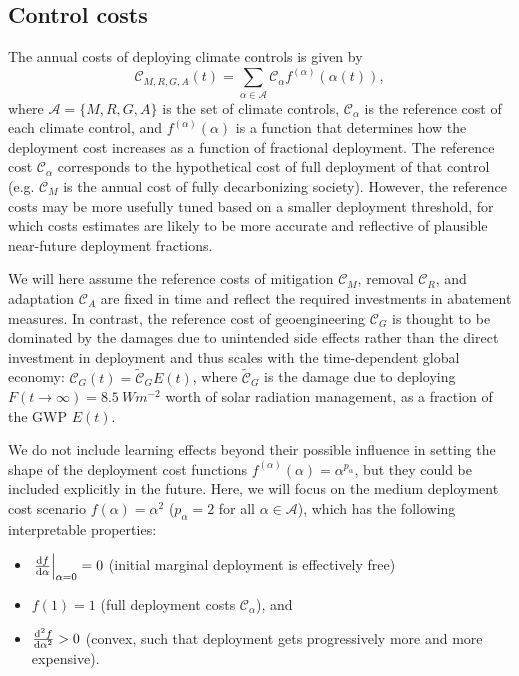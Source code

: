 \documentclass{article}
\begin{document}
\subsection{Control costs}

The annual costs of deploying climate controls is given by
\begin{equation}
    \mathcal{C}_{M, R, G, A}(t) = \sum_{\alpha \in \mathcal{A}} \mathcal{C}_{\alpha} f^{(\alpha)}(\alpha(t)),
\end{equation}
where $\mathcal{A} = \{M, R, G, A \}$ is the set of climate controls, $\mathcal{C}_{\alpha}$ is the reference cost of each climate control, and $f^{(\alpha)}(\alpha)$ is a function that determines how the deployment cost increases as a function of fractional deployment. The reference cost $\mathcal{C}_{\alpha}$ corresponds to the hypothetical cost of full deployment of that control (e.g. $\mathcal{C}_{M}$ is the annual cost of fully decarbonizing society). However, the reference costs may be more usefully tuned based on a smaller deployment threshold, for which costs estimates are likely to be more accurate and reflective of plausible near-future deployment fractions.

We will here assume the reference costs of mitigation $\mathcal{C}_{M}$, removal $\mathcal{C}_{R}$, and adaptation $\mathcal{C}_{A}$ are fixed in time and reflect the required investments in abatement measures. In contrast, the reference cost of geoengineering $\mathcal{C}_{G}$ is thought to be dominated by the damages due to unintended side effects rather than the direct investment in deployment and thus scales with the time-dependent global economy: $\mathcal{C}_{G}(t) = \tilde{\mathcal{C}}_{G} E(t)$, where $\tilde{\mathcal{C}}_{G}$ is the damage due to deploying $F(t \rightarrow \infty) = \SI{8.5}{W m^{-2}}$ worth of solar radiation management, as a fraction of the GWP $E(t)$.

We do not include learning effects beyond their possible influence in setting the shape of the deployment cost functions $f^{(\alpha)}(\alpha) = \alpha^{p_{\alpha}}$, but they could be included explicitly in the future. Here, we will focus on the medium deployment cost scenario $f(\alpha) = \alpha^{2}$ ($p_{\alpha} = 2$ for all $\alpha \in \mathcal{A}$), which has the following interpretable properties: 
\begin{itemize}
    \item $\left. \dv{f}{\alpha}\right|_{\alpha=0} = 0$ (initial marginal deployment is effectively free)
    \item $f(1) = 1$ (full deployment costs $\mathcal{C}_{\alpha}$), and
    \item $\dv[2]{f}{\alpha} > 0$ (convex, such that deployment gets progressively more and more expensive).
\end{itemize}
\end{document}
